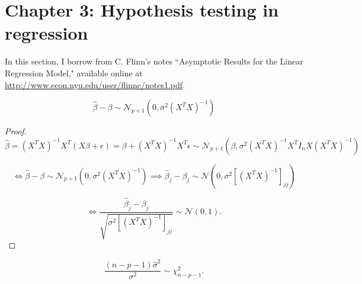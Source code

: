 \section{Chapter 3: Hypothesis testing in regression}

In this section, I borrow from C. Flinn's notes ``Asymptotic Results for the Linear Regression Model," available online at \url{http://www.econ.nyu.edu/user/flinnc/notes1.pdf}.


\begin{proposition}\label{linreg.dist.beta}

\[
\hat{\beta} - \beta  \sim  \mathcal{N}_{p+1} \left(0, \sigma^2  (X^TX)^{-1}  \right) 
\]

\end{proposition}

\begin{proof}

\[
\hat{\beta} = (X^TX)^{-1}X^T(X \beta + \epsilon) = \beta + (X^TX)^{-1}X^T\epsilon \sim \mathcal{N}_{p+1} \left( \beta, \sigma^2  (X^TX)^{-1}X^T I_n  X (X^TX)^{-1}  \right) 
\]

\[
\iff \hat{\beta} - \beta  \sim  \mathcal{N}_{p+1} \left(0, \sigma^2  (X^TX)^{-1}  \right)  \implies \hat{\beta}_j - \beta_j  \sim  \mathcal{N} \left(0, \sigma^2   \left[ (X^TX)^{-1} \right]_{jj}  \right) 
\]

\begin{equation}\label{linreg.ols.t.beta.hat.proof.1a}
\iff \frac{\hat{\beta}_j - \beta_j}{\sqrt{ \sigma^2 \left[ (X^TX)^{-1} \right]_{jj} }}  \sim  \mathcal{N} \left(0, 1 \right).
\end{equation}

\end{proof}

\begin{proposition}\label{linreg.dist.sig.chi}

\[
\frac{(n - p - 1)\hat{\sigma}^2 }{\sigma^2} \sim \chi_{n-p-1}^2.
\]

\end{proposition}

